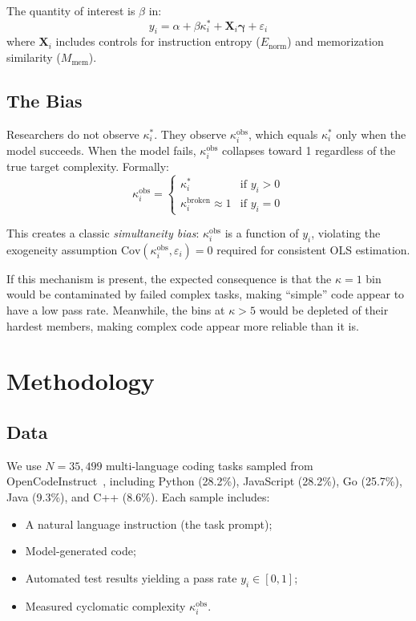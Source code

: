 \documentclass[conference]{IEEEtran}
\begin{document}
The quantity of interest is $\beta$ in:
\begin{equation}
    y_i = \alpha + \beta \kappa_i^* + \mathbf{X}_i \boldsymbol{\gamma} + \varepsilon_i
    \label{eq:structural}
\end{equation}
where $\mathbf{X}_i$ includes controls for instruction entropy ($E_{\text{norm}}$) and memorization similarity ($M_{\text{mem}}$).

\subsection{The Bias}

Researchers do not observe $\kappa_i^*$. They observe $\kappa_i^{\text{obs}}$, which equals $\kappa_i^*$ only when the model succeeds. When the model fails, $\kappa_i^{\text{obs}}$ collapses toward 1 regardless of the true target complexity. Formally:
\begin{equation}
    \kappa_i^{\text{obs}} = 
    \begin{cases}
        \kappa_i^* & \text{if } y_i > 0 \\
        \kappa_i^{\text{broken}} \approx 1 & \text{if } y_i = 0
    \end{cases}
\end{equation}

This creates a classic \emph{simultaneity bias}: $\kappa_i^{\text{obs}}$ is a function of $y_i$, violating the exogeneity assumption $\text{Cov}(\kappa_i^{\text{obs}}, \varepsilon_i) = 0$ required for consistent OLS estimation.

If this mechanism is present, the expected consequence is that the $\kappa = 1$ bin would be contaminated by failed complex tasks, making ``simple'' code appear to have a low pass rate. Meanwhile, the bins at $\kappa > 5$ would be depleted of their hardest members, making complex code appear more reliable than it is.

\section{Methodology}
\label{sec:methodology}

\subsection{Data}

We use $N = 35{,}499$ multi-language coding tasks sampled from OpenCodeInstruct~\cite{opencodeinst}, including Python (28.2\%), JavaScript (28.2\%), Go (25.7\%), Java (9.3\%), and C++ (8.6\%). Each sample includes:
\begin{itemize}
    \item A natural language instruction (the task prompt);
    \item Model-generated code;
    \item Automated test results yielding a pass rate $y_i \in [0, 1]$;
    \item Measured cyclomatic complexity $\kappa_i^{\text{obs}}$.
\end{itemize}
\end{document}
